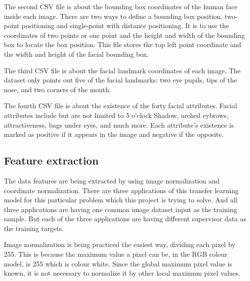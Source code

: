 \documentclass{article}
\begin{document}
The second CSV file is about the bounding box coordinates of the human face inside each image. There are two ways to define a bounding box position, two-point positioning and single-point with distance positioning. It is to use the coordinates of two points or one point and the height and width of the bounding box to locate the box position. This file stores the top left point coordinate and the width and height of the facial bounding box. 

The third CSV file is about the facial landmark coordinates of each image. The dataset only points out five of the facial landmarks: two eye pupils, tips of the nose, and two corners of the mouth. 

The fourth CSV file is about the existence of the forty facial attributes. Facial attributes include but are not limited to 5 o'clock Shadow, arched eybrows, attractiveness, bags under eyes, and much more. Each attribute's existence is marked as positive if it appears in the image and negative if the opposite. 

\subsection{Feature extraction}
The data features are being extracted by using image normalization and coordinate normalization. There are three applications of this transfer learning model for this particular problem which this project is trying to solve. And all three applications are having one common image dataset input as the training sample. But each of the three applications are having different supervisor data as the training targets. 

Image normalization is being practiced the easiest way, dividing each pixel by 255. This is because the maximum value a pixel can be, in the RGB colour model, is 255 which is colour white. Since the global maximum pixel value is known, it is not necessary to normalize it by other local maximum pixel values. 
\end{document}
